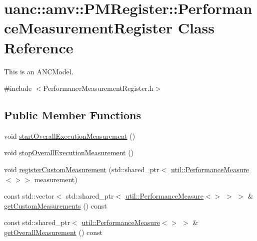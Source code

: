 \hypertarget{classuanc_1_1amv_1_1_p_m_register_1_1_performance_measurement_register}{}\section{uanc\+:\+:amv\+:\+:P\+M\+Register\+:\+:Performance\+Measurement\+Register Class Reference}
\label{classuanc_1_1amv_1_1_p_m_register_1_1_performance_measurement_register}


This is an A\+N\+C\+Model.  




{\ttfamily \#include $<$Performance\+Measurement\+Register.\+h$>$}

\subsection*{Public Member Functions}
\begin{DoxyCompactItemize}
\item 
void \hyperlink{classuanc_1_1amv_1_1_p_m_register_1_1_performance_measurement_register_af790642629d149fc257d6541e674f2e8}{start\+Overall\+Execution\+Measurement} ()
\item 
void \hyperlink{classuanc_1_1amv_1_1_p_m_register_1_1_performance_measurement_register_a39c0be8c717c30eee29763a2e1e19848}{stop\+Overall\+Execution\+Measurement} ()
\item 
void \hyperlink{classuanc_1_1amv_1_1_p_m_register_1_1_performance_measurement_register_aa0950d36ffc0588844632034ebe5f473}{register\+Custom\+Measurement} (std\+::shared\+\_\+ptr$<$ \hyperlink{classuanc_1_1util_1_1_performance_measure}{util\+::\+Performance\+Measure}$<$$>$$>$ measurement)
\item 
const std\+::vector$<$ std\+::shared\+\_\+ptr$<$ \hyperlink{classuanc_1_1util_1_1_performance_measure}{util\+::\+Performance\+Measure}$<$$>$ $>$ $>$ \& \hyperlink{classuanc_1_1amv_1_1_p_m_register_1_1_performance_measurement_register_a461a8558d8b0358de9c6b3c6e9ba7f9e}{get\+Custom\+Measurements} () const 
\item 
const std\+::shared\+\_\+ptr$<$ \hyperlink{classuanc_1_1util_1_1_performance_measure}{util\+::\+Performance\+Measure}$<$$>$ $>$ \& \hyperlink{classuanc_1_1amv_1_1_p_m_register_1_1_performance_measurement_register_a764cef42743ad8c1655f9975f3782ec6}{get\+Overall\+Measurement} () const 
\end{DoxyCompactItemize}


